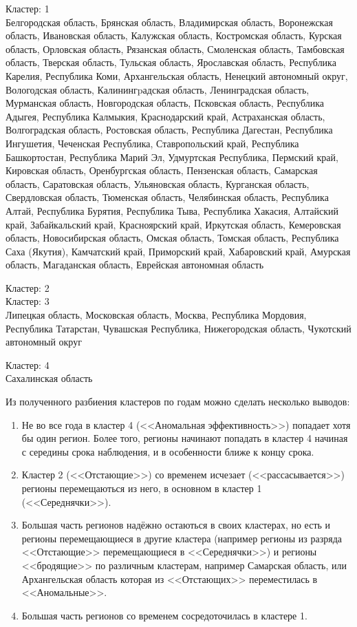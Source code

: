 \documentclass[11pt]{article}
\begin{document}
\begin{itemize}
  Кластер:  1 \\
 Белгородская область, Брянская область, Владимирская область, Воронежская область, Ивановская область, Калужская область, Костромская область, Курская область, Орловская область, Рязанская область, Смоленская область, Тамбовская область, Тверская область, Тульская область, Ярославская область, Республика Карелия, Республика Коми, Архангельская область, Ненецкий автономный округ, Вологодская область, Калинингpадская область, Ленинградская область, Мурманская область, Новгородская область, Псковская область, Республика Адыгея, Республика Калмыкия, Краснодарский край, Астраханская область, Волгоградская область, Ростовская область, Республика Дагестан, Республика Ингушетия, Чеченская Республика, Ставропольский край, Республика Башкортостан, Республика Марий Эл, Удмуртская Республика, Пермский край, Кировская область, Оренбургская область, Пензенская область, Самарская область, Саратовская область, Ульяновская область, Курганская область, Свердловская область, Тюменская область, Челябинская область, Республика Алтай, Республика Бурятия, Республика Тыва, Республика Хакасия, Алтайский край, Забайкальский край, Красноярский край, Иркутская область, Кемеровская область, Новосибирская область, Омская область, Томская область, Республика Саха (Якутия), Камчатский край, Приморский край, Хабаровский край, Амурская область, Магаданская область, Еврейская автономная область

  Кластер:  2 \\


  Кластер:  3 \\
 Липецкая область, Московская область, Москва, Республика Мордовия, Республика Татарстан, Чувашская Республика, Нижегородская область, Чукотский автономный округ

  Кластер:  4 \\
 Сахалинская область
\end{itemize}


    Из полученного разбиения кластеров по годам можно сделать несколько
выводов:

\begin{enumerate}
\item Не во все года в кластер 4 (<<Аномальная эффективность>>) попадает хотя бы один регион. Более того, регионы начинают попадать в кластер 4 начиная с середины срока наблюдения, и в особенности ближе к концу срока.
\item Кластер 2 (<<Отстающие>>) со временем исчезает (<<рассасывается>>) регионы перемещаються из него, в основном в кластер 1 (<<Середнячки>>).
\item Большая часть регионов надёжно остаються в своих кластерах, но есть и регионы перемещающиеся в другие кластера (например регионы из разряда <<Отстающие>> перемещающиеся в <<Середнячки>>) и регионы <<бродящие>> по различным кластерам, например Самарская область, или Архангельская область которая из <<Отстающих>> переместилась в <<Аномальные>>.
\item Большая часть регионов со временем сосредоточилась в кластере 1.
\end{enumerate}
\end{document}
